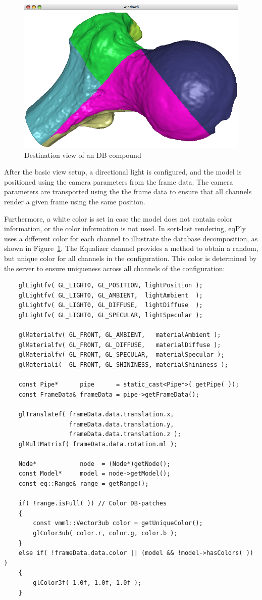 \documentclass[10pt,a4]{scrartcl}
\newcommand{\fig}[1]{Figure~\ref{#1}}
\begin{document}
\begin{figure}
  \includegraphics[width=.382\textwidth]{images/DB.png}
  {\caption{\small\label{fDB}Destination view of an DB compound}}
\end{figure}
After the basic view setup, a directional light is configured, and the
model is positioned using the camera parameters from the frame data. The
camera parameters are transported using the the frame data to ensure
that all channels render a given frame using the same position.

Furthermore, a white color is set in case the model does not contain
color information, or the color information is not used. In
sort-last rendering, \textsf{eqPly} uses a different color for each
channel to illustrate the database decomposition, as shown in
\fig{fDB}. The Equalizer channel provides a method to obtain a random,
but unique color for all channels in the configuration. This color is
determined by the server to ensure uniqueness across all channels of the
configuration:

{\footnotesize\begin{lstlisting}
    glLightfv( GL_LIGHT0, GL_POSITION, lightPosition );
    glLightfv( GL_LIGHT0, GL_AMBIENT,  lightAmbient  );
    glLightfv( GL_LIGHT0, GL_DIFFUSE,  lightDiffuse  );
    glLightfv( GL_LIGHT0, GL_SPECULAR, lightSpecular );

    glMaterialfv( GL_FRONT, GL_AMBIENT,   materialAmbient );
    glMaterialfv( GL_FRONT, GL_DIFFUSE,   materialDiffuse );
    glMaterialfv( GL_FRONT, GL_SPECULAR,  materialSpecular );
    glMateriali(  GL_FRONT, GL_SHININESS, materialShininess );

    const Pipe*      pipe      = static_cast<Pipe*>( getPipe( ));
    const FrameData& frameData = pipe->getFrameData();

    glTranslatef( frameData.data.translation.x,
                  frameData.data.translation.y,
                  frameData.data.translation.z );
    glMultMatrixf( frameData.data.rotation.ml );

    Node*            node  = (Node*)getNode();
    const Model*     model = node->getModel();
    const eq::Range& range = getRange();

    if( !range.isFull( )) // Color DB-patches
    {
        const vmml::Vector3ub color = getUniqueColor();
        glColor3ub( color.r, color.g, color.b );
    }
    else if( !frameData.data.color || (model && !model->hasColors( )) )
    {
        glColor3f( 1.0f, 1.0f, 1.0f );
    }
    
\end{lstlisting}}
\end{document}

